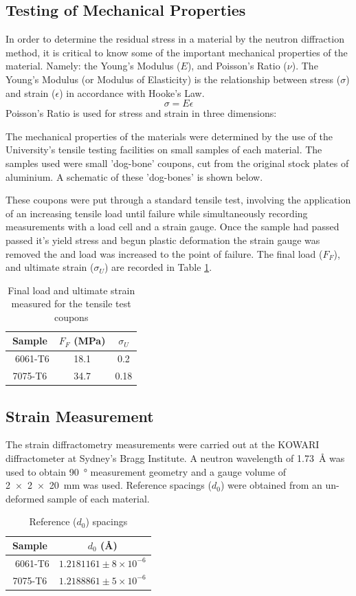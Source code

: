 \documentclass[11pt, oneside]{article}   	%
\begin{document}
\subsection{Testing of Mechanical Properties}
In order to determine the residual stress in a material by the neutron diffraction method, it is critical to know some of the important mechanical properties of the material. Namely: the Young's Modulus ($E$), and Poisson's Ratio ($\nu$). The Young's Modulus (or Modulus of Elasticity) is the relationship between stress ($\sigma$) and strain ($\epsilon$) in accordance with Hooke's Law.
$$\sigma = E\epsilon$$
Poisson's Ratio is used for stress and strain in three dimensions:

The mechanical properties of the materials were determined by the use of the University's tensile testing facilities on small samples of each material. The samples used were small 'dog-bone' coupons, cut from the original stock plates of aluminium. A schematic of these 'dog-bones' is shown below.

These coupons were put through a standard tensile test, involving the application of an increasing tensile load until failure while simultaneously recording measurements with a load cell and a strain gauge. Once the sample had passed passed it's yield stress and begun plastic deformation the strain gauge was removed the and load was increased to the point of failure. The final load ($F_F$), and ultimate strain ($\sigma_U$) are recorded in Table \ref{tab:a}.
\begin{table}[h]
	\centering
	\caption{Final load and ultimate strain measured for the tensile test coupons}\label{tab:a}
	\begin{tabular}[c]{c | c c}
	Sample & $F_F$ (\si{\mega\pascal}) & $\sigma_U$ \\ \hline\
	6061-T6 & 18.1 & 0.2 \\
	7075-T6 & 34.7 & 0.18 \\
	\end{tabular}
\end{table}
\subsection{Strain Measurement}
The strain diffractometry measurements were carried out at the KOWARI diffractometer at Sydney's Bragg Institute. A neutron wavelength of \SI{1.73}{\angstrom} was used to obtain \SI{90}{\degree} measurement geometry and a gauge volume of \SI{2x2x20}{\milli\meter} was used. Reference spacings ($d_0$) were obtained from an un-deformed sample of each material. \cite{Handout}
\begin{table}[h]
	\centering
	\caption{Reference ($d_0$) spacings}\label{tab:reference}
	\begin{tabular}[c]{c c}
	Sample & $d_0$ (\si{\angstrom}) \\ \hline \
	6061-T6 & $1.2181161 \pm 8\times10^{-6}$\\
	7075-T6 & $1.2188861 \pm 5\times10^{-6}$\\
	\end{tabular}
\end{table}
\end{document}

